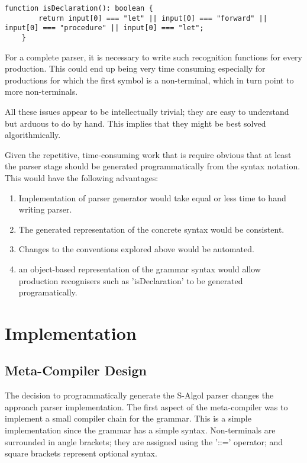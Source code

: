 \documentclass{article}
\begin{document}
\begin{lstlisting}[caption=TODO: caption, label=lst:realrecog]
    function isDeclaration(): boolean {
    	return input[0] === "let" || input[0] === "forward" || input[0] === "procedure" || input[0] === "let";
    }
\end{lstlisting}

For a complete parser, it is necessary to write such recognition functions for every production. This could end up being very time consuming especially for productions for which the first symbol is a non-terminal, which in turn point to more non-terminals.

All these issues appear to be intellectually trivial; they are easy to understand but arduous to do by hand. This implies that they might be best solved algorithmically. 

Given the repetitive, time-consuming work that is require obvious that at least the parser stage should be generated programmatically from the syntax notation. This would have the following advantages:

\begin{enumerate}
\item Implementation of parser generator would take equal or less time to hand writing parser.
\item The generated representation of the concrete syntax would be consistent.
\item Changes to the conventions explored above would be automated.
\item  an object-based representation of the grammar syntax would allow production recognisers such as 'isDeclaration' to be generated programatically.
\end{enumerate}



\section{Implementation}

\subsection{Meta-Compiler Design}

The decision to programmatically generate the S-Algol parser changes the approach parser implementation. The first aspect of the meta-compiler was to implement a small compiler chain for the grammar. This is a simple implementation since the grammar has a simple syntax. Non-terminals are surrounded in angle brackets; they are assigned using the '::=' operator; and square brackets represent optional syntax.
\end{document}
